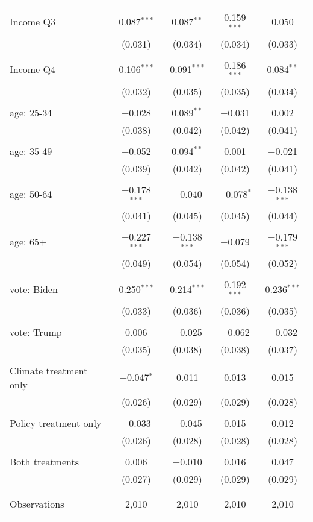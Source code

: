 \begin{tabular}{@{\extracolsep{5pt}}lcccc}
  & & & & \\ 
 Income Q3 & 0.087$^{***}$ & 0.087$^{**}$ & 0.159$^{***}$ & 0.050 \\ 
  & (0.031) & (0.034) & (0.034) & (0.033) \\ 
  & & & & \\ 
 Income Q4 & 0.106$^{***}$ & 0.091$^{***}$ & 0.186$^{***}$ & 0.084$^{**}$ \\ 
  & (0.032) & (0.035) & (0.035) & (0.034) \\ 
  & & & & \\ 
 age: 25-34 & $-$0.028 & 0.089$^{**}$ & $-$0.031 & 0.002 \\ 
  & (0.038) & (0.042) & (0.042) & (0.041) \\ 
  & & & & \\ 
 age: 35-49 & $-$0.052 & 0.094$^{**}$ & 0.001 & $-$0.021 \\ 
  & (0.039) & (0.042) & (0.042) & (0.041) \\ 
  & & & & \\ 
 age: 50-64 & $-$0.178$^{***}$ & $-$0.040 & $-$0.078$^{*}$ & $-$0.138$^{***}$ \\ 
  & (0.041) & (0.045) & (0.045) & (0.044) \\ 
  & & & & \\ 
 age: 65+ & $-$0.227$^{***}$ & $-$0.138$^{***}$ & $-$0.079 & $-$0.179$^{***}$ \\ 
  & (0.049) & (0.054) & (0.054) & (0.052) \\ 
  & & & & \\ 
 vote: Biden & 0.250$^{***}$ & 0.214$^{***}$ & 0.192$^{***}$ & 0.236$^{***}$ \\ 
  & (0.033) & (0.036) & (0.036) & (0.035) \\ 
  & & & & \\ 
 vote: Trump & 0.006 & $-$0.025 & $-$0.062 & $-$0.032 \\ 
  & (0.035) & (0.038) & (0.038) & (0.037) \\ 
  & & & & \\ 
 Climate treatment only & $-$0.047$^{*}$ & 0.011 & 0.013 & 0.015 \\ 
  & (0.026) & (0.029) & (0.029) & (0.028) \\ 
  & & & & \\ 
 Policy treatment only & $-$0.033 & $-$0.045 & 0.015 & 0.012 \\ 
  & (0.026) & (0.028) & (0.028) & (0.028) \\ 
  & & & & \\ 
 Both treatments & 0.006 & $-$0.010 & 0.016 & 0.047 \\ 
  & (0.027) & (0.029) & (0.029) & (0.029) \\ 
  & & & & \\ 
\hline \\[-1.8ex] 

Observations & 2,010 & 2,010 & 2,010 & 2,010 \\ 
\hline 
\hline \\[-1.8ex] 
\end{tabular} 